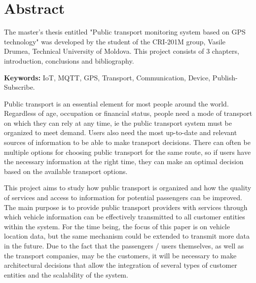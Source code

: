 \chapter*{Abstract}
\thispagestyle{empty}
\par The master's thesis entitled "Public transport monitoring system based on GPS technology" was developed by the student of the CRI-201M group, Vasile Drumea, Technical University of Moldova. This project consists of 3 chapters, introduction, conclusions and bibliography.
\par \textbf{Keywords:} IoT, MQTT, GPS, Transport, Communication, Device, Publish-Subscribe.
\par Public transport is an essential element for most people around the world. Regardless of age, occupation or financial status, people need a mode of transport on which they can rely at any time, ie the public transport system must be organized to meet demand. Users also need the most up-to-date and relevant sources of information to be able to make transport decisions. There can often be multiple options for choosing public transport for the same route, so if users have the necessary information at the right time, they can make an optimal decision based on the available transport options.
\par This project aims to study how public transport is organized and how the quality of services and access to information for potential passengers can be improved. The main purpose is to provide public transport providers with services through which vehicle information can be effectively transmitted to all customer entities within the system. For the time being, the focus of this paper is on vehicle location data, but the same mechanism could be extended to transmit more data in the future. Due to the fact that the passengers / users themselves, as well as the transport companies, may be the customers, it will be necessary to make architectural decisions that allow the integration of several types of customer entities and the scalability of the system.

